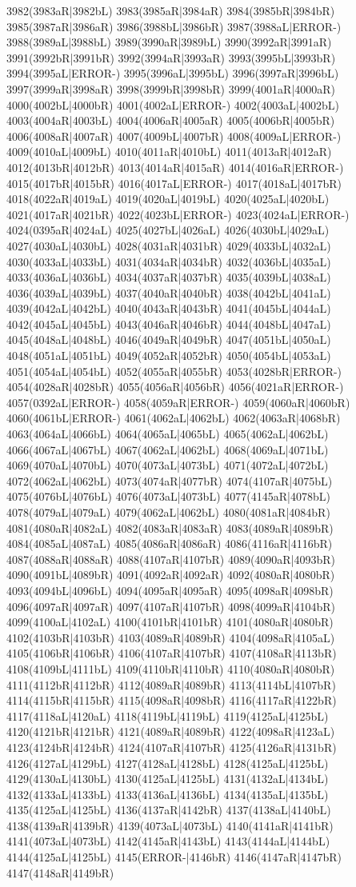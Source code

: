 3982(3983aR|3982bL) 3983(3985aR|3984aR) 3984(3985bR|3984bR) 3985(3987aR|3986aR) 3986(3988bL|3986bR) 3987(3988aL|ERROR-) 3988(3989aL|3988bL) 3989(3990aR|3989bL) 3990(3992aR|3991aR) 3991(3992bR|3991bR) 3992(3994aR|3993aR) 3993(3995bL|3993bR) 3994(3995aL|ERROR-) 3995(3996aL|3995bL) 3996(3997aR|3996bL) 3997(3999aR|3998aR) 3998(3999bR|3998bR) 3999(4001aR|4000aR) 4000(4002bL|4000bR) 4001(4002aL|ERROR-) 4002(4003aL|4002bL) 4003(4004aR|4003bL) 4004(4006aR|4005aR) 4005(4006bR|4005bR) 4006(4008aR|4007aR) 4007(4009bL|4007bR) 4008(4009aL|ERROR-) 4009(4010aL|4009bL) 4010(4011aR|4010bL) 4011(4013aR|4012aR) 4012(4013bR|4012bR) 4013(4014aR|4015aR) 4014(4016aR|ERROR-) 4015(4017bR|4015bR) 4016(4017aL|ERROR-) 4017(4018aL|4017bR) 4018(4022aR|4019aL) 4019(4020aL|4019bL) 4020(4025aL|4020bL) 4021(4017aR|4021bR) 4022(4023bL|ERROR-) 4023(4024aL|ERROR-) 4024(0395aR|4024aL) 4025(4027bL|4026aL) 4026(4030bL|4029aL) 4027(4030aL|4030bL) 4028(4031aR|4031bR) 4029(4033bL|4032aL) 4030(4033aL|4033bL) 4031(4034aR|4034bR) 4032(4036bL|4035aL) 4033(4036aL|4036bL) 4034(4037aR|4037bR) 4035(4039bL|4038aL) 4036(4039aL|4039bL) 4037(4040aR|4040bR) 4038(4042bL|4041aL) 4039(4042aL|4042bL) 4040(4043aR|4043bR) 4041(4045bL|4044aL) 4042(4045aL|4045bL) 4043(4046aR|4046bR) 4044(4048bL|4047aL) 4045(4048aL|4048bL) 4046(4049aR|4049bR) 4047(4051bL|4050aL) 4048(4051aL|4051bL) 4049(4052aR|4052bR) 4050(4054bL|4053aL) 4051(4054aL|4054bL) 4052(4055aR|4055bR) 4053(4028bR|ERROR-) 4054(4028aR|4028bR) 4055(4056aR|4056bR) 4056(4021aR|ERROR-) 4057(0392aL|ERROR-) 4058(4059aR|ERROR-) 4059(4060aR|4060bR) 4060(4061bL|ERROR-) 4061(4062aL|4062bL) 4062(4063aR|4068bR) 4063(4064aL|4066bL) 4064(4065aL|4065bL) 4065(4062aL|4062bL) 4066(4067aL|4067bL) 4067(4062aL|4062bL) 4068(4069aL|4071bL) 4069(4070aL|4070bL) 4070(4073aL|4073bL) 4071(4072aL|4072bL) 4072(4062aL|4062bL) 4073(4074aR|4077bR) 4074(4107aR|4075bL) 4075(4076bL|4076bL) 4076(4073aL|4073bL) 4077(4145aR|4078bL) 4078(4079aL|4079aL) 4079(4062aL|4062bL) 4080(4081aR|4084bR) 4081(4080aR|4082aL) 4082(4083aR|4083aR) 4083(4089aR|4089bR) 4084(4085aL|4087aL) 4085(4086aR|4086aR) 4086(4116aR|4116bR) 4087(4088aR|4088aR) 4088(4107aR|4107bR) 4089(4090aR|4093bR) 4090(4091bL|4089bR) 4091(4092aR|4092aR) 4092(4080aR|4080bR) 4093(4094bL|4096bL) 4094(4095aR|4095aR) 4095(4098aR|4098bR) 4096(4097aR|4097aR) 4097(4107aR|4107bR) 4098(4099aR|4104bR) 4099(4100aL|4102aL) 4100(4101bR|4101bR) 4101(4080aR|4080bR) 4102(4103bR|4103bR) 4103(4089aR|4089bR) 4104(4098aR|4105aL) 4105(4106bR|4106bR) 4106(4107aR|4107bR) 4107(4108aR|4113bR) 4108(4109bL|4111bL) 4109(4110bR|4110bR) 4110(4080aR|4080bR) 4111(4112bR|4112bR) 4112(4089aR|4089bR) 4113(4114bL|4107bR) 4114(4115bR|4115bR) 4115(4098aR|4098bR) 4116(4117aR|4122bR) 4117(4118aL|4120aL) 4118(4119bL|4119bL) 4119(4125aL|4125bL) 4120(4121bR|4121bR) 4121(4089aR|4089bR) 4122(4098aR|4123aL) 4123(4124bR|4124bR) 4124(4107aR|4107bR) 4125(4126aR|4131bR) 4126(4127aL|4129bL) 4127(4128aL|4128bL) 4128(4125aL|4125bL) 4129(4130aL|4130bL) 4130(4125aL|4125bL) 4131(4132aL|4134bL) 4132(4133aL|4133bL) 4133(4136aL|4136bL) 4134(4135aL|4135bL) 4135(4125aL|4125bL) 4136(4137aR|4142bR) 4137(4138aL|4140bL) 4138(4139aR|4139bR) 4139(4073aL|4073bL) 4140(4141aR|4141bR) 4141(4073aL|4073bL) 4142(4145aR|4143bL) 4143(4144aL|4144bL) 4144(4125aL|4125bL) 4145(ERROR-|4146bR) 4146(4147aR|4147bR) 4147(4148aR|4149bR) 